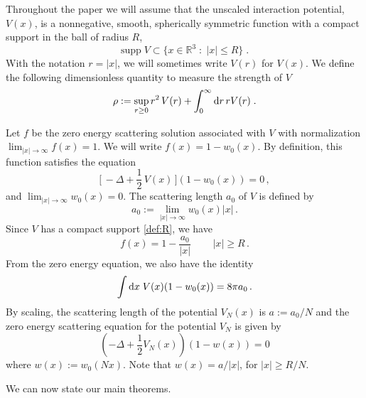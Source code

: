 \documentclass[11pt]{article}
\newcommand{\rd}{{\rm d}}
\newcommand{\be}{\begin{equation}}
\newcommand{\ee}{\end{equation}}
\newcommand{\bR}{{\mathbb R}}
\begin{document}
\medskip

Throughout the paper we will assume that the unscaled interaction
potential, $V(x)$, is a nonnegative, smooth, spherically symmetric
function with a compact support in the ball of radius $R$, \be
  \mbox{supp} \; V \subset \{ x\in \bR^3 \; : \; |x|\leq R\} \;.
\label{def:R}
\ee
With the notation $r=|x|$, we will sometimes write $V(r)$ for $V(x)$.
We define the following dimensionless quantity to measure
the strength of $V$
\begin{equation}\label{eq:defrho} \rho :=
\sup_{r \geq 0} r^2 \, V(r) + \int_0^{\infty} \rd r \, r V(r) \; .
\end{equation}


Let $f$ be the zero energy scattering solution
associated with $V$ with normalization
 $\lim_{|x| \to \infty} f (x) =1$. We will  write
$f(x)=1-w_0(x)$. By definition, this function  satisfies the
equation
\begin{equation}\label{ze}
\Big [ \, -\Delta + \frac 12  \,  {V (x)}  \, \Big ] (1-w_0 (x)) = 0
\, ,
\end{equation}
and $\lim_{|x| \to \infty} w_0 (x) =0$. The scattering length $a_0$
of $V$ is defined by
 \be \label{eq:scatlength}
a_0 := \lim_{|x| \to \infty} w_0 (x) |x| \, . \ee
Since $V$ has a compact
support \eqref{def:R},
we have \be\label{fb} f(x) =  1 - \frac{a_0}{|x|} \, \qquad  |x|
\geq R \, . \ee {F}rom the zero energy equation, we also have the
identity \be\label{13} \int \rd x \; V(x) (1-w_0(x)) = 8 \pi a_0 \, .
\ee
By scaling,
the scattering length of the potential $ V_N (x)$ is $a:=
a_0/N$ and the zero energy scattering equation for the
potential $V_N$ is given by
\begin{equation}\label{eq:defw1}
\left( -\Delta + \frac{1}{2} V_N (x) \right) (1 -w(x)) = 0
\end{equation}
where $w(x) := w_0 (Nx)$. Note that $w(x) = a / |x|$, for $|x| \geq
R/N$.


\medskip





We can now state our main theorems.
\end{document}
